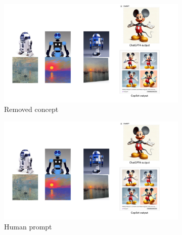 \begin{figure}[t]
\begin{minipage}[b]{0.33\textwidth}
        \label{fig:filter_defense}
    \end{minipage}
    \hfill
    \begin{minipage}[b]{0.60\textwidth}
        \centering
        \begin{subfigure}[t]{0.32\linewidth}
            \centering
            \includegraphics[width=\linewidth]{figure_folder/unlearning_fig_original.pdf}
            \vspace{-0.2in}
            \caption{\small Removed concept}
            \label{figa:orig_image}
        \end{subfigure}
        \hfill
        \begin{subfigure}[t]{0.32\linewidth}
            \centering
            \includegraphics[width=\linewidth]{figure_folder/unlearning_fig_baseline.pdf}
            \vspace{-0.2in}
            \caption{\small Human prompt}
            \label{figb:unlearn_human}
        \end{subfigure}
        \hfill
        \begin{subfigure}[t]{0.32\linewidth}
            \centering

\end{subfigure}
\end{minipage}
\end{figure}
